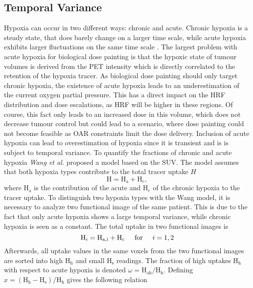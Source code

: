 \subsection{Temporal Variance}\label{chap:wang}
Hypoxia can occur in two different ways: chronic and acute. Chronic hypoxia is a steady state, that does barely change on a larger time scale, while acute hypoxia exhibits larger fluctuations on the same time scale \cite{pmid9783887, pmid18086391,pmid19203843, pmid15234030, pmid17543402, pmid16098619, pmid17674980, pmid18313529}. The largest problem with acute hypoxia for biological dose painting is that the hypoxic state of tumour volumes is derived from the PET intensity which is directly correlated to the retention of the hypoxia tracer. As biological dose painting should only target chronic hypoxia, the existence of acute hypoxia leads to an underestimation of the current oxygen partial pressure. This has a direct impact on the HRF distribution and dose escalations, as HRF will be higher in these regions. Of course, this fact only leads to an increased dose in this volume, which does not decrease tumour control but could lead to a scenario, where dose painting could not become feasible as OAR constraints limit the dose delivery. Inclusion of acute hypoxia can lead to overestimation of hypoxia since it is transient and is is subject to temporal variance. To quantify the fractions of chronic and acute hypoxia \textit{Wang et al.} \cite{pmid19928070} proposed a model based on the SUV. The model assumes that both hypoxia types contribute to the total tracer uptake $H$
\begin{equation}
\mathrm{H} = \mathrm{H}_\mathrm{a} + \mathrm{H}_\mathrm{c},
\end{equation}
where $ \mathrm{H}_\mathrm{a}$ is the contribution of the acute and $ \mathrm{H}_\mathrm{c}$ of the chronic hypoxia to the tracer uptake. To distinguish two hypoxia types with the Wang model, it is necessary to analyze two functional image of the same patient. This is due to the fact that only acute hypoxia shows a large temporal variance, while chronic hypoxia is seen as a constant. The total uptake in two functional images is
\begin{equation}
\mathrm{H}_i = \mathrm{H}_\mathrm{a,i} + \mathrm{H}_\mathrm{c} \hspace{0.5cm}\mathrm{for}\hspace{0.5cm}i=1,2
\end{equation}
Afterwards, all uptake values in the same voxels from the two functional images are sorted into high H$_\mathrm{h}$ and small H$_\mathrm{s}$ readings. The fraction of high uptakes H$_\mathrm{h}$ with respect to acute hypoxia is denoted $\omega = \mathrm{H}_\mathrm{ah}/\mathrm{H}_\mathrm{h}$. Defining $x = (\mathrm{H}_\mathrm{h} - \mathrm{H}_\mathrm{s})/\mathrm{H}_\mathrm{h}$ gives the following relation
